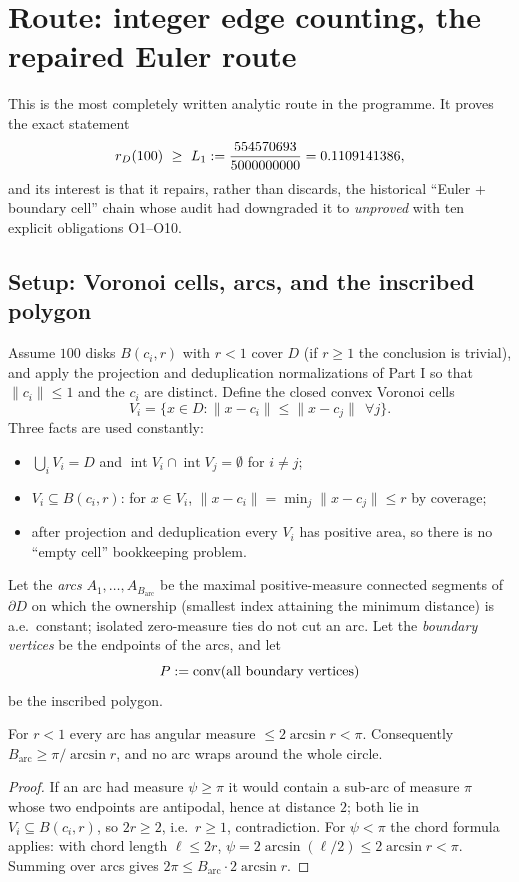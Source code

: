 \section{Route: integer edge counting, the repaired Euler route}
\label{sec:integer-edge}

This is the most completely written analytic route in the programme. It proves the exact statement
\[
\rD(100)\ \ge\ L_1:=\frac{554570693}{5000000000}=0.1109141386 ,
\]
and its interest is that it repairs, rather than discards, the historical ``Euler + boundary cell''
chain whose audit had downgraded it to \emph{unproved} with ten explicit obligations O1--O10.

\subsection{Setup: Voronoi cells, arcs, and the inscribed polygon}

Assume $100$ disks $B(c_i,r)$ with $r<1$ cover $D$ (if $r\ge1$ the conclusion is trivial), and
apply the projection and deduplication normalizations of Part I so that $\|c_i\|\le1$ and the
$c_i$ are distinct. Define the closed convex Voronoi cells
\[
V_i=\{x\in D:\|x-c_i\|\le\|x-c_j\|\ \ \forall j\}.
\]
Three facts are used constantly:
\begin{itemize}[leftmargin=1.4em,itemsep=2pt]
\item $\bigcup_iV_i=D$ and $\operatorname{int}V_i\cap\operatorname{int}V_j=\emptyset$ for $i\ne j$;
\item $V_i\subseteq B(c_i,r)$: for $x\in V_i$, $\|x-c_i\|=\min_j\|x-c_j\|\le r$ by coverage;
\item after projection and deduplication every $V_i$ has positive area, so there is no ``empty
cell'' bookkeeping problem.
\end{itemize}
Let the \emph{arcs} $A_1,\dots,A_{B_{\mathrm{arc}}}$ be the maximal positive-measure connected
segments of $\partial D$ on which the ownership (smallest index attaining the minimum distance) is
a.e.\ constant; isolated zero-measure ties do not cut an arc. Let the \emph{boundary vertices} be
the endpoints of the arcs, and let
\[
P:=\operatorname{conv}(\text{all boundary vertices})
\]
be the inscribed polygon.

\begin{lemma}\label{lem:arc}
For $r<1$ every arc has angular measure $\le2\arcsin r<\pi$. Consequently
$B_{\mathrm{arc}}\ge\pi/\arcsin r$, and no arc wraps around the whole circle.
\end{lemma}
\begin{proof}
If an arc had measure $\psi\ge\pi$ it would contain a sub-arc of measure $\pi$ whose two endpoints
are antipodal, hence at distance $2$; both lie in $V_i\subseteq B(c_i,r)$, so $2r\ge2$, i.e.\
$r\ge1$, contradiction. For $\psi<\pi$ the chord formula applies: with chord length
$\ell\le2r$, $\psi=2\arcsin(\ell/2)\le2\arcsin r<\pi$. Summing over arcs gives
$2\pi\le B_{\mathrm{arc}}\cdot2\arcsin r$.
\end{proof}

